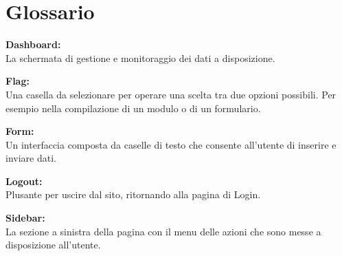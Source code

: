 \section{Glossario}
\textbf{Dashboard:}\\La schermata di gestione e monitoraggio dei dati a disposizione.

\textbf{Flag:}\\Una casella da selezionare per operare una scelta tra due opzioni possibili. Per esempio nella compilazione di un modulo o di un formulario.

\textbf{Form:}\\Un interfaccia composta da caselle di testo che consente all'utente di inserire e inviare dati.

\textbf{Logout:}\\Plusante per uscire dal sito, ritornando alla pagina di Login. 

\textbf{Sidebar:}\\ La sezione a sinistra della pagina con il menu delle azioni che sono messe a disposizione all'utente.